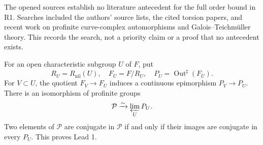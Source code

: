 The opened sources establish no literature antecedent for the
full order bound in R1. Searches included the authors' source
lists, the cited torsion papers, and recent work on profinite
curve-complex automorphisms and Galois--Teichm\"uller theory.
This records the search, not a priority claim or a proof that
no antecedent exists.

For an open characteristic subgroup \(U\) of \(F\), put
\[
 R_U=R_{\mathrm{nil}}(U),\quad F_U=F/R_U,\quad
 P_U=\operatorname{Out}^{\sharp}(F_U).
\]
For \(V\subset U\), the quotient \(F_V\to F_U\) induces
a continuous epimorphism \(P_V\to P_U\). There is an
isomorphism of profinite groups
\[
                 \mathcal P \xrightarrow{\sim}\varprojlim_U P_U.
\]
Two elements of \(\mathcal P\) are conjugate in \(\mathcal P\)
if and only if their images are conjugate in every \(P_U\).
This proves Lead 1.

